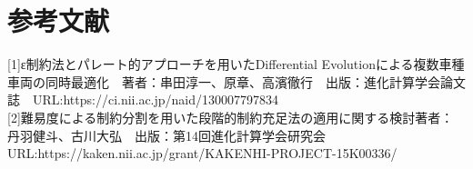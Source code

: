 \documentclass[twocolumn,10pt]{jarticle}
\begin{document}




\section{参考文献}
[1]ε制約法とパレート的アプローチを用いたDifferential Evolutionによる複数車種車両の同時最適化　著者：串田淳一、原章、高濱徹行　出版：進化計算学会論文誌　URL:https://ci.nii.ac.jp/naid/130007797834\\

[2]難易度による制約分割を用いた段階的制約充足法の適用に関する検討著者：丹羽健斗、古川大弘　出版：第14回進化計算学会研究会 URL:https://kaken.nii.ac.jp/grant/KAKENHI-PROJECT-15K00336/
\end{document}
